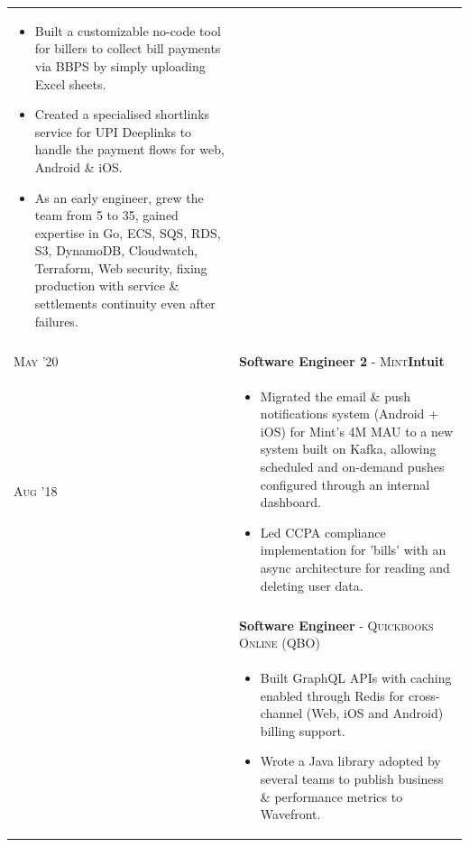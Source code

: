 \documentclass[a4paper,10pt]{extarticle} %
\begin{document}
\begin{tabularx}{\linewidth}{l | X}
\begin{itemize}[leftmargin=*, nosep, before=\vspace{-1.0\baselineskip}, after=\vspace{-1.0\baselineskip}]
  \item Built a customizable no-code tool for billers to collect bill payments via BBPS by simply uploading Excel sheets.
  \item Created a specialised shortlinks service for UPI Deeplinks to handle the payment flows for web, Android \& iOS.
  \item As an early engineer, grew the team from 5 to 35, gained expertise in Go, ECS, SQS, RDS, S3, DynamoDB, Cloudwatch, Terraform, Web security, fixing production with service \& settlements continuity even after failures.
\end{itemize}\\
\multicolumn{2}{c}{} \\

\textsc{May '20} & \textbf{Software Engineer 2} \textsc{- Mint}\hfill\raisebox{-.1\height}{ \hspace{0.3em}}\textbf{Intuit}\\
\textsc{Aug '18} & \begin{itemize}[leftmargin=*, nosep, before=\vspace{-1.0\baselineskip}, after=\vspace{-1.3\baselineskip}]
  \item Migrated the email \& push notifications system (Android + iOS) for Mint's 4M MAU to a new system built on Kafka, allowing scheduled and on-demand pushes configured through an internal dashboard.
  \item Led CCPA compliance implementation for 'bills' with an async architecture for reading and deleting user data.
\end{itemize}\\\\
& \textbf{Software Engineer} \textsc{- Quickbooks Online (QBO)}\\
& \begin{itemize}[leftmargin=*, nosep, before=\vspace{-1.0\baselineskip}, after=\vspace{-1.3\baselineskip}]
  \item Built GraphQL APIs with caching enabled through Redis for cross-channel (Web, iOS and Android) billing support.
  \item Wrote a Java library adopted by several teams to publish business \& performance metrics to Wavefront.

\end{itemize}
\end{tabularx}
\end{document}
